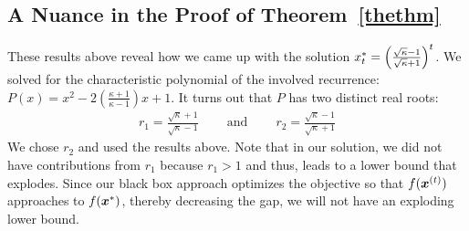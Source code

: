 \documentclass{article}
\begin{document}
\subsection*{A Nuance in the Proof of Theorem~\ref{thethm}}
These results above reveal how we came up with the solution 
$
    {x}^{\ast}_t 
    = 
    \left(
        \frac{\sqrt{\kappa} - 1}{\sqrt{\kappa} + 1}
    \right)^t
$.
We solved for the characteristic polynomial of the involved recurrence: $P(x) = x^2 -2\left(\frac{\kappa + 1}{\kappa - 1}\right)x + 1$. 
It turns out that $P$ has two distinct real roots:
\begin{align*}
    r_1
    =
    \frac{
        \sqrt{\kappa} + 1
    }{
        \sqrt{\kappa} - 1
    }
    \qquad\ \text{and}\ \qquad
    r_2
    =
    \frac{
        \sqrt{\kappa} - 1
    }{
        \sqrt{\kappa} + 1
    }
\end{align*}
We chose $r_2$ and used the results above.
Note that in our solution, we did not have contributions from $r_1$ because $r_1 > 1$ and thus, leads to a lower bound that explodes.
Since our black box approach optimizes the objective so that $f({\bm{x}}^{(t)})$ approaches to $f({\bm{x}}^{\ast})$, thereby decreasing the gap, we will not have an exploding lower bound.
\end{document}
